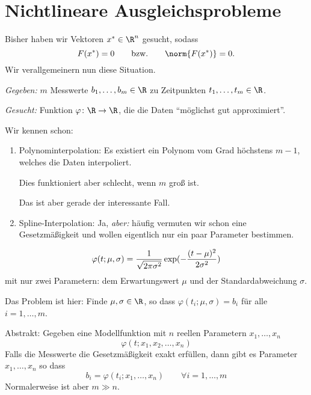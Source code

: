 \chapter{Nichtlineare Ausgleichsprobleme}

Bisher haben wir Vektoren $x^* \in \R^n$ gesucht, sodass
\begin{equation*}
 F (x^*)=0 \qquad \text{bzw.} \qquad \norm{F(x^*)} = 0.
\end{equation*}
Wir verallgemeinern nun diese Situation.

\medskip

\emph{Gegeben:} $m$ Messwerte $b_1,\ldots,b_m \in \R$ zu Zeitpunkten $t_1,\ldots,t_m \in \R$.

\medskip


\emph{Gesucht:} Funktion $\varphi \colon \R \to \R$, die die Daten "`möglichst gut approximiert"'.

\bigskip

Wir kennen schon:
\begin{enumerate}
 \item Polynominterpolation: Es existiert ein Polynom vom Grad höchstens $m-1$,
   welches die Daten interpoliert.

   Dies funktioniert aber schlecht, wenn $m$ groß ist.

   Das ist aber gerade der interessante Fall.


 \item Spline-Interpolation: Ja, \emph{aber:} häufig vermuten wir schon eine Gesetzmäßigkeit und wollen eigentlich nur ein paar Parameter bestimmen.
\end{enumerate}

\begin{bsp} [Normalverteilung]
\begin{equation*} \\
 \varphi(t;\mu,\sigma)= \frac{1}{\sqrt{2 \pi \sigma^2}} \exp ( -\frac{(t-\mu)^2}{2 \sigma^2} )
\end{equation*}
mit nur zwei Parametern: dem Erwartungswert $\mu$ und der Standardabweichung $\sigma$.

\medskip

Das Problem ist hier: Finde $\mu,\sigma \in \R$, so dass $\varphi (t_i;\mu,\sigma) = b_i$ für alle $i=1,\ldots,m$.
\end{bsp}

\bigskip

Abstrakt: Gegeben eine Modellfunktion mit $n$ reellen Parametern $x_1,\ldots,x_n$
\begin{equation*}
 \varphi(t;x_1,x_2,\ldots,x_n)
\end{equation*}
Falls die Messwerte die Gesetzmäßigkeit exakt erfüllen, dann gibt es Parameter $x_1,\ldots,x_n$ so dass
\begin{equation*}
 b_i=\varphi(t_i;x_1,\ldots,x_n) \qquad \forall i=1,\ldots,m
\end{equation*}
Normalerweise ist aber $m \gg n$.

